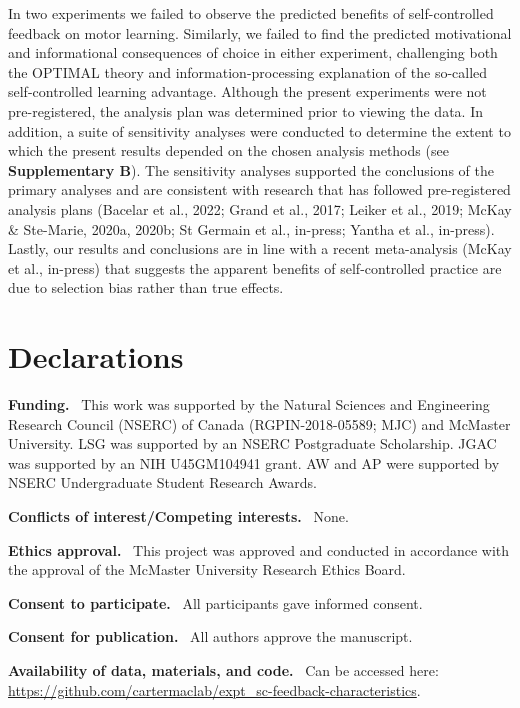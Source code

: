 \documentclass[
  man, donotrepeattitle,floatsintext]{apa7}
\begin{document}
In two experiments we failed to observe the predicted benefits of self-controlled feedback on motor learning. Similarly, we failed to find the predicted motivational and informational consequences of choice in either experiment, challenging both the OPTIMAL theory and information-processing explanation of the so-called self-controlled learning advantage. Although the present experiments were not pre-registered, the analysis plan was determined prior to viewing the data. In addition, a suite of sensitivity analyses were conducted to determine the extent to which the present results depended on the chosen analysis methods (see \textbf{Supplementary B}). The sensitivity analyses supported the conclusions of the primary analyses and are consistent with research that has followed pre-registered analysis plans (Bacelar et al., 2022; Grand et al., 2017; Leiker et al., 2019; McKay \& Ste-Marie, 2020a, 2020b; St Germain et al., in-press; Yantha et al., in-press). Lastly, our results and conclusions are in line with a recent meta-analysis (McKay et al., in-press) that suggests the apparent benefits of self-controlled practice are due to selection bias rather than true effects.

\vspace{10ex}

\hypertarget{declarations}{%
\section{Declarations}\label{declarations}}

\noindent
\textbf{Funding.} ~This work was supported by the Natural Sciences and Engineering Research Council (NSERC) of Canada (RGPIN-2018-05589; MJC) and McMaster University. LSG was supported by an NSERC Postgraduate Scholarship. JGAC was supported by an NIH U45GM104941 grant. AW and AP were supported by NSERC Undergraduate Student Research Awards.

\noindent
\textbf{Conflicts of interest/Competing interests.} ~None.

\noindent
\textbf{Ethics approval.} ~This project was approved and conducted in accordance with the approval of the McMaster University Research Ethics Board.

\noindent
\textbf{Consent to participate.} ~All participants gave informed consent.

\noindent
\textbf{Consent for publication.} ~All authors approve the manuscript.

\noindent
\textbf{Availability of data, materials, and code.} ~Can be accessed here: \url{https://github.com/cartermaclab/expt_sc-feedback-characteristics}.
\end{document}
